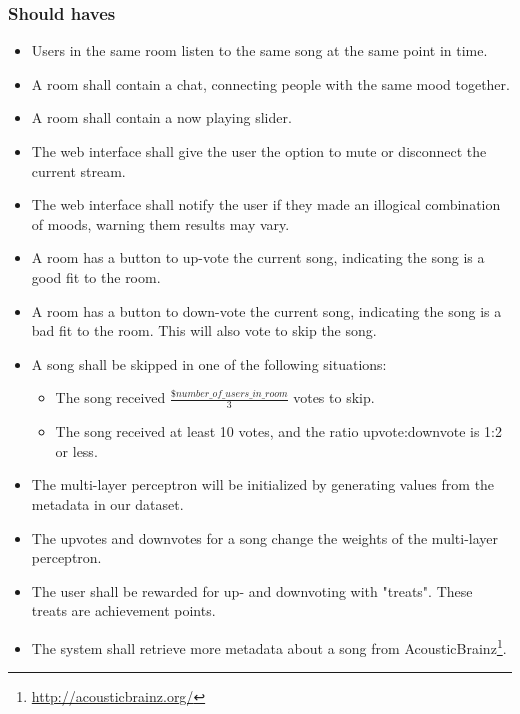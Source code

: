 \subsubsection{Should haves}
\begin{itemize}
\item Users in the same room listen to the same song at the same point in time.

\item A room shall contain a chat, connecting people with the same mood together.

\item A room shall contain a now playing slider.

\item The web interface shall give the user the option to mute or disconnect the current stream.

\item The web interface shall notify the user if they made an illogical combination of moods, warning them results may vary.

\item A room has a button to up-vote the current song, indicating the song is a good fit to the room.

\item A room has a button to down-vote the current song, indicating the song is a bad fit to the room. This will also vote to skip the song.

\item A song shall be skipped in one of the following situations:
	\begin{itemize}
	\item The song received $\frac{\$number\_of\_users\_in\_room}{3}$ votes to skip.
	\item The song received at least 10 votes, and the ratio upvote:downvote is 1:2 or less.
	\end{itemize}

\item The multi-layer perceptron will be initialized by generating values from the metadata in our dataset.

\item The upvotes and downvotes for a song change the weights of the multi-layer perceptron.

\item The user shall be rewarded for up- and downvoting with "treats". These treats are achievement points.

\item The system shall retrieve more metadata about a song from \gls{AcousticBrainz}\footnote{\url{http://acousticbrainz.org/}}.

\end{itemize}

